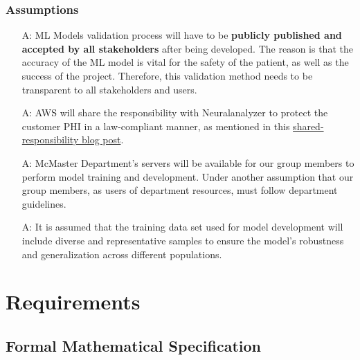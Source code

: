 \documentclass[12pt]{article}
\newcounter{assumpnum} %
\begin{document}
\subsubsection{Assumptions} \label{sec_assumpt}
\begin{itemize}

\item[A\refstepcounter{assumpnum}\theassumpnum \label{A_meaningfulLabel}:] ML Models validation process will have to be \textbf{publicly published and accepted by all stakeholders} after being developed. The reason is that the accuracy of the ML model is vital for the safety of the patient, as well as the success of the project. Therefore, this validation method needs to be transparent to all stakeholders and users.

\item[A\refstepcounter{assumpnum}\theassumpnum \label{A_meaningfulLabel}:] AWS will share the responsibility with Neuralanalyzer to protect the customer PHI in a law-compliant manner, as mentioned in this \href{https://docs.aws.amazon.com/whitepapers/latest/aws-risk-and-compliance/shared-responsibility-model.html}{shared-responsibility blog post}.

\item[A\refstepcounter{assumpnum}\theassumpnum \label{A_meaningfulLabel}:] McMaster Department's servers will be available for our group members to perform model training and development. Under another assumption that our group members, as users of department resources, must follow department guidelines.

\item[A\refstepcounter{assumpnum}\theassumpnum \label{A_meaningfulLabel}:] It is assumed that the training data set used for model development will include diverse and representative samples to ensure the model's robustness and generalization across different populations.
\end{itemize}

  \clearpage
\section{Requirements}
\subsection{Formal Mathematical Specification}
\end{document}

